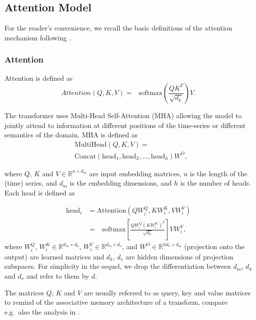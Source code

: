\documentclass{ieeeaccess}
\begin{document}
\subsection{Attention Model}
For the reader's convenience, we recall the basic definitions of the attention mechanism following \cite{VaswaniEtAl}.

\subsubsection{Attention}
\newcommand {\softmax}{\mathop{}\,\mathrm{softmax}}

Attention is defined as
\begin{equation}
Attention(Q, K, V)=\softmax \left(\frac{QK^T}{\sqrt{d_k}} \right) V.
\end{equation}

The transformer uses Multi-Head Self-Attention (MHA) allowing the model to jointly attend to information at different positions of the time-series or different semantics of the domain. MHA is defined as 
\begin{align} 
&\text{MultiHead}(Q, K, V) = \\
&\text{Concat}\left(\text{head}_1, \text{head}_2, \ldots, \text{head}_h \right)  W^O, 
\end{align} 


where $Q$, $K$ and $V\in \mathbb{R}^{n\times d_m}$ are input embedding matrices, $n$ is the length of the (time) series, and $d_m$ is the embedding dimensions, and $h$ is the number of heads. Each head is defined as

\begin{align} 
\text{head}_i 	&= \text{Attention}(QW_i^Q, KW_i^K, VW_i^V) \\
			&= \softmax \left[\frac{QW_i^Q(KW_i^K)^T}{\sqrt{d_k}} \right] VW_i^V,
\end{align} 
where $W_i^Q$, $W_i^K \in \mathbb{R}^{d_m\times d_k}$, $W_i^V \in \mathbb{R}^{d_m\times d_v}$, and $W^O \in \mathbb{R}^{hd_v\times d_m}$ (projection onto the output) are learned matrices and $d_k$, $d_v$ are hidden dimensions of projection subspaces. For simplicity in the sequel, we drop the differentiation between $d_m$, $d_k$ and $d_v$ and refer to them by $d$. 

The matrices $Q$, $K$ and $V$ are usually referred to as query, key and value matrices to remind of the associative memory architecture of a transform, compare e.g.\ also the analysis in \cite{RamsauerEtAl}.
\end{document}

